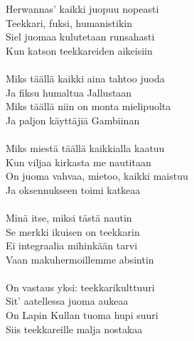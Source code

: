 
Herwannas' kaikki juopuu nopeasti \\
Teekkari, fuksi, humanistikin \\
Siel juomaa kulutetaan runsahasti \\
Kun katson teekkareiden aikeisiin \\
\hspace{10mm} \\
Miks täällä kaikki aina tahtoo juoda \\
Ja fiksu humaltua Jallustaan \\
Miks täällä niin on monta mielipuolta \\
Ja paljon käyttäjiä Gambiinan \\
\hspace{10mm} \\
Miks miestä täällä kaikkialla kaatuu \\
Kun viljaa kirkasta me nautitaan \\
On juoma vahvaa, mietoo, kaikki maistuu \\
Ja oksennukseen toimi katkeaa \\
\hspace{10mm} \\
Minä itse, miksi tästä nautin \\
Se merkki ikuisen on teekkarin \\
Ei integraalia mihinkään tarvi \\
Vaan makuhermoillemme absintin \\
\hspace{10mm} \\
On vastaus yksi: teekkarikulttuuri \\
Sit' aatellessa juoma aukeaa \\
On Lapin Kullan tuoma hupi suuri \\
Siis teekkareille malja nostakaa \\